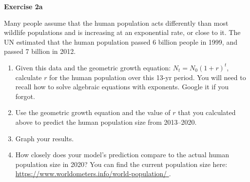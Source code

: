 \documentclass[12pt]{article}\usepackage[]{graphicx}\usepackage[]{color}
\begin{document}







{\bf Exercise 2a \\}


Many people assume that the human population acts differently than
most wildlife populations and is increasing at an exponential rate, or
close to it. The UN estimated that the human population passed 6
billion people in 1999, and passed 7 billion in 2012. 

\begin{enumerate}
  \item Given this data and the geometric growth equation:
    $N_t = N_0(1+r)^t$, calculate $r$ for the human population over
    this 13-yr period. You will need to recall how to solve algebraic
    equations with exponents. Google it if you forgot.
  \item Use the geometric growth equation and the value of $r$ that
    you calculated above to predict the human population size from 
    2013--2020.
  \item Graph your results.
  \item How closely does your model's prediction compare to the actual
    human population size in 2020? You can find the current population
    size here: \url{
      https://www.worldometers.info/world-population/
    }.
\end{enumerate}
\end{document}
